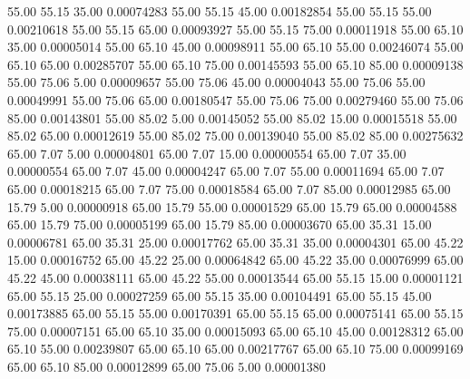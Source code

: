      55.00     55.15     35.00     0.00074283
     55.00     55.15     45.00     0.00182854
     55.00     55.15     55.00     0.00210618
     55.00     55.15     65.00     0.00093927
     55.00     55.15     75.00     0.00011918
     55.00     65.10     35.00     0.00005014
     55.00     65.10     45.00     0.00098911
     55.00     65.10     55.00     0.00246074
     55.00     65.10     65.00     0.00285707
     55.00     65.10     75.00     0.00145593
     55.00     65.10     85.00     0.00009138
     55.00     75.06      5.00     0.00009657
     55.00     75.06     45.00     0.00004043
     55.00     75.06     55.00     0.00049991
     55.00     75.06     65.00     0.00180547
     55.00     75.06     75.00     0.00279460
     55.00     75.06     85.00     0.00143801
     55.00     85.02      5.00     0.00145052
     55.00     85.02     15.00     0.00015518
     55.00     85.02     65.00     0.00012619
     55.00     85.02     75.00     0.00139040
     55.00     85.02     85.00     0.00275632
     65.00      7.07      5.00     0.00004801
     65.00      7.07     15.00     0.00000554
     65.00      7.07     35.00     0.00000554
     65.00      7.07     45.00     0.00004247
     65.00      7.07     55.00     0.00011694
     65.00      7.07     65.00     0.00018215
     65.00      7.07     75.00     0.00018584
     65.00      7.07     85.00     0.00012985
     65.00     15.79      5.00     0.00000918
     65.00     15.79     55.00     0.00001529
     65.00     15.79     65.00     0.00004588
     65.00     15.79     75.00     0.00005199
     65.00     15.79     85.00     0.00003670
     65.00     35.31     15.00     0.00006781
     65.00     35.31     25.00     0.00017762
     65.00     35.31     35.00     0.00004301
     65.00     45.22     15.00     0.00016752
     65.00     45.22     25.00     0.00064842
     65.00     45.22     35.00     0.00076999
     65.00     45.22     45.00     0.00038111
     65.00     45.22     55.00     0.00013544
     65.00     55.15     15.00     0.00001121
     65.00     55.15     25.00     0.00027259
     65.00     55.15     35.00     0.00104491
     65.00     55.15     45.00     0.00173885
     65.00     55.15     55.00     0.00170391
     65.00     55.15     65.00     0.00075141
     65.00     55.15     75.00     0.00007151
     65.00     65.10     35.00     0.00015093
     65.00     65.10     45.00     0.00128312
     65.00     65.10     55.00     0.00239807
     65.00     65.10     65.00     0.00217767
     65.00     65.10     75.00     0.00099169
     65.00     65.10     85.00     0.00012899
     65.00     75.06      5.00     0.00001380
